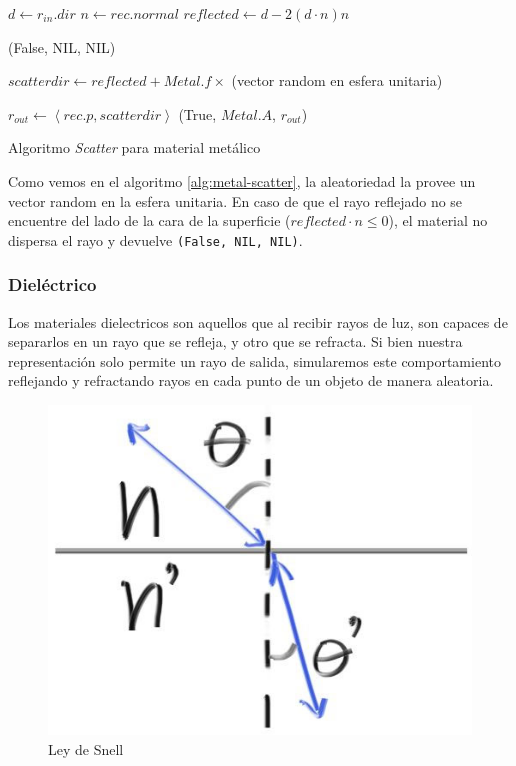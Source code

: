 \begin{algorithm}[H]
\begin{algorithmic}[1]

    \State $d \gets r_{in}.dir$
    \State $n \gets rec.normal$
    \State $reflected \gets d - 2 (d \cdot n) n $

        \State \Return (False, NIL, NIL)
    \EndIf

    \State $scatterdir \gets reflected + Metal.f \times$ (vector random en esfera
    unitaria)

    \State $r_{out} \gets \left \langle rec.p, scatterdir \right \rangle$
    \State \Return (True, $Metal.A$, $r_{out}$)
\EndFunction
\end{algorithmic}
\caption{Algoritmo \textit{Scatter} para material metálico}
\label{alg:metal-scatter}
\end{algorithm}

Como vemos en el algoritmo \ref{alg:metal-scatter}, la aleatoriedad la provee un
vector random en la esfera unitaria. En caso de que el rayo reflejado no se
encuentre del lado de la cara de la superficie ($reflected \cdot n \le 0$), el
material no dispersa el rayo y devuelve \texttt{(False, NIL, NIL)}.

\subsubsection{Dieléctrico}

Los materiales dielectricos son aquellos que al recibir rayos de luz, son
capaces de separarlos en un rayo que se refleja, y otro que se refracta. Si bien
nuestra representación solo permite un rayo de salida, simularemos este
comportamiento reflejando y refractando rayos en cada punto de un objeto de
manera aleatoria.

\begin{figure}
    \centering
    \includegraphics[width=.7\textwidth]{imgs/refraction.jpg}
    \caption{Ley de Snell}
    \label{fig:snell-law}
\end{figure}

